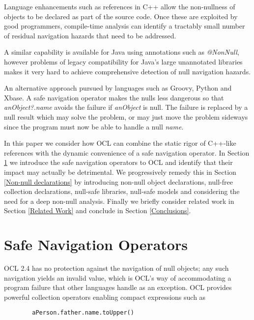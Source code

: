 \documentclass{llncs}
\begin{document}
Language enhancements such as references\cite{c++-references} in C++ allow the non-nullness of objects to be declared as part of the source code. Once these are exploited by good programmers, compile-time analysis can identify a tractably small number of residual navigation hazards that need to be addressed.

A similar capability is available for Java using annotations such as \emph{@NonNull}\cite{java-NonNull}, however problems of legacy compatibility for Java's large unannotated libraries makes it very hard to achieve comprehensive detection of null navigation hazards.

An alternative approach pursued by languages such as Groovy\cite{groovy}, Python\cite{python} and Xbase\cite{xbase}. A safe navigation operator makes the nulls less dangerous so that \emph{anObject?.name} avoids the failure if \emph{anObject} is null. The failure is replaced by a null result which may solve the problem, or may just move the problem sideways since the program must now be able to handle a null \emph{name}.

In this paper we consider how OCL can combine the static rigor of C++-like references with the dynamic convenience of a safe navigation operator. In Section \ref{Safe Navigation Operators} we introduce the safe navigation operators to OCL and identify that their impact may actually be detrimental. We progressively remedy this in Section \ref{Non-null declarations} by introducing non-null object declarations, null-free collection declarations, null-safe libraries, null-safe models and considering the need for a deep non-null analysis. Finally we briefly consider related work in Section \ref{Related Work} and conclude in Section \ref{Conclusions}.

\section{Safe Navigation Operators}\label{Safe Navigation Operators}

OCL 2.4 has no protection against the navigation of null objects; any such navigation yields an invalid value, which is OCL's way of accommodating a program failure that other languages handle as an exception. OCL provides powerful collection operators enabling compact expressions such as

\begin{verbatim}
        aPerson.father.name.toUpper()
\end{verbatim}
\end{document}
